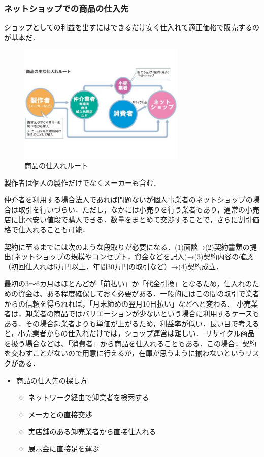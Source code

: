 \subsubsection{ネットショップでの商品の仕入先}

ショップとしての利益を出すにはできるだけ安く仕入れて適正価格で販売するのが基本だ．

\begin{figure}[htbp]

\centering
\includegraphics[width=8cm,clip]{netshop.pdf}
\caption{商品の仕入れルート}
\label{netshop}

\end{figure}

製作者は個人の製作だけでなくメーカーも含む．

仲介者を利用する場合法人であれば問題ないが個人事業者のネットショップの場合は取引を行いづらい．ただし，なかには小売りを行う業者もあり，通常の小売店に比べ安い値段で購入できる．数量をまとめて交渉することで，さらに割引価格で仕入れることも可能．

契約に至るまでには次のような段取りが必要になる．(1)面談→(2)契約書類の提出(ネットショップの規模やコンセプト，資金などを記入)→(3)契約内容の確認（初回仕入れは5万円以上．年間30万円の取引など）→(4)契約成立．

最初の3～6カ月はほとんどが「前払い」か「代金引換」となるため，仕入れのための資金は、ある程度確保しておく必要がある．一般的にはこの間の取引で業者からの信頼を得られれば，「月末締めの翌月10日払い」などへと変わる．
小売業者は，卸業者の商品ではバリエーションが少ないという場合に利用するケースもある．その場合卸業者よりも単価が上がるため，利益率が低い．長い目で考えると，小売業者からの仕入れだけでは，ショップ運営は難しい．
リサイクル商品を扱う場合などは、「消費者」から商品を仕入れることもある．この場合，契約を交わすことがないので用意に行えるが，在庫が思うように揃わないというリスクがある．


\begin{itemize}
 \item	商品の仕入先の探し方
\begin{itemize}
\setlength{\parskip}{3mm}
 \item	ネットワーク経由で卸業者を検索する
 \item	メーカとの直接交渉
 \item	実店舗のある卸売業者から直接仕入れる
 \item	展示会に直接足を運ぶ


\end{itemize}
\end{itemize}



